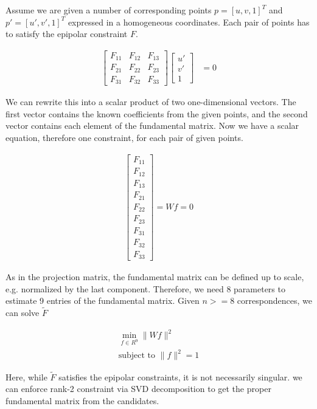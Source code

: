 \documentclass[twoside]{article}
\begin{document}
Assume we are given a number of corresponding points $p = [u, v, 1]^T$ and $p'= [u',v',1]^T$ expressed in a homogeneous coordinates. Each pair of points has to satisfy the epipolar constraint $F$.

\begin{align}
[u, v, 1] \begin{bmatrix}
F_{11} & F_{12} & F_{13} \\
F_{21} & F_{22} & F_{23} \\
F_{31} & F_{32} & F_{33}
\end{bmatrix} \begin{bmatrix}
u' \\ v' \\ 1
\end{bmatrix} &= 0
\end{align}

We can rewrite this into a scalar product of two one-dimensional vectors. The first vector contains the known coefficients from the given points, and the second vector contains each element of the fundamental matrix. Now we have a scalar equation, therefore one constraint, for each pair of given points.

\begin{align}
[uu', uv', u, vu', vv', v, u', v', 1]\begin{bmatrix}
F_{11} \\F_{12} \\F_{13} \\F_{21} \\F_{22} \\F_{23} \\F_{31} \\F_{32} \\F_{33}
\end{bmatrix} = Wf = 0
\end{align}

As in the projection matrix, the fundamental matrix can be defined up to scale, e.g. normalized by the last component. Therefore, we need 8 parameters to estimate 9 entries of the fundamental matrix. Given $n>=8$ correspondences, we can solve $\tilde{F}$

\begin{align}
\min_{f\in{R^9}}\|Wf\|^2 \\
\text{subject to } \|f\|^2 = 1
\end{align}

Here, while $\tilde{F}$ satisfies the epipolar constraints, it is not necessarily singular. we can enforce rank-2 constraint via SVD decomposition to get the proper fundamental matrix from the candidates.
\end{document}
